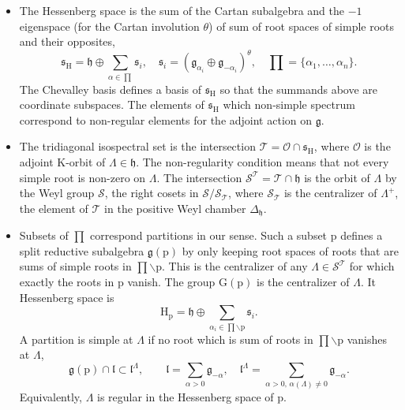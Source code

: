 \documentclass[reqno]{amsart}
\newcommand{\p}{\mathrm{p}}
\renewcommand{\gg}{\mathfrak{g}}
\newcommand{\hh}{\mathfrak{h}}
\renewcommand{\ll}{\mathfrak{l}}
\renewcommand{\ss}{\mathfrak{s}}
\newcommand{\cO}{\mathcal{O}}
\newcommand{\cS}{\mathcal{S}}
\newcommand{\cT}{\mathcal{T}}
\newcommand{\K}{\mathrm{K}}
\newcommand{\G}{\mathrm{G}}
\renewcommand{\H}{\mathrm{H}}
\begin{document}
\begin{itemize}
 \item The Hessenberg space is the sum of the Cartan subalgebra and the $-1$ eigenspace (for the Cartan involution $\theta$) of sum of root spaces of simple roots and their opposites,
\[\ss_\H=\hh\oplus \sum_{\alpha\in \prod}\ss_i,\quad \ss_i=(\gg_{\alpha_i}\oplus \gg_{-\alpha_{i}})^\theta,\quad \prod=\{\alpha_1,\dots,\alpha_n\}.\]
The Chevalley basis defines a basis of $\ss_\H$ so that the summands above are coordinate subspaces.
The  elements of $\ss_\H$ which non-simple spectrum correspond to non-regular elements for the adjoint action on $\gg$.
\item The tridiagonal isospectral set is the intersection $\cT=\cO\cap \ss_\H$, where $\cO$ is the adjoint $\K$-orbit of $\Lambda\in \hh$. The non-regularity condition means that not every simple root is non-zero on $\Lambda$. The intersection $\cS^{\cT}=\cT\cap \hh$ is the orbit of $\Lambda$ by the Weyl group $\cS$, the right cosets in $\cS/\cS_{\cT}$, where $\cS_{\cT}$ is the centralizer of $\Lambda^+$, the  element of $\cT$ in the positive Weyl chamber $\Delta_\hh$.

\item  Subsets of $\prod$ correspond partitions in our sense. Such a subset  $\p$ defines a split reductive subalgebra $\gg(\p)$ by only keeping root spaces of roots that are sums of simple roots in  $\prod\backslash \p$. This is the centralizer of any $\Lambda\in \cS^\cT$ for which exactly the roots in $\p$ vanish. The group $\G(\p)$ is the centralizer of $\Lambda$. It Hessenberg space is
\[\H_\p=\hh\oplus \sum_{\alpha_i\in \prod\backslash\p}\ss_i.\]
A partition is simple at $\Lambda$ if no root which is sum of roots in $\prod\backslash \p$ vanishes at $\Lambda$,
\[\gg(\p)\cap \ll\subset  \ll^\Lambda,\qquad \ll=\sum_{\alpha>0}\gg_{-\alpha},\quad \ll^\Lambda=\sum_{\alpha>0,\,\alpha(\Lambda)\neq 0}\gg_{-\alpha}.\]
 Equivalently, $\Lambda$ is regular in the Hessenberg space of $\p$.


\end{itemize}
\end{document}
